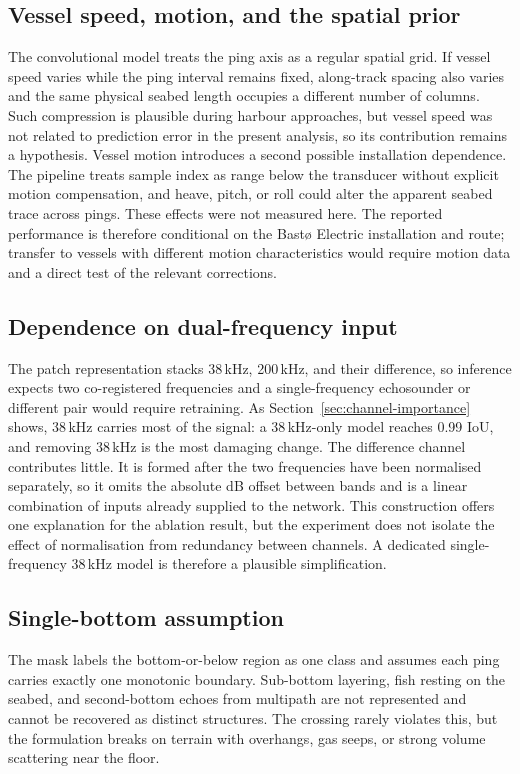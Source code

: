 \subsection{Vessel speed, motion, and the spatial prior}
\label{sec:vessel-speed-prior}
The convolutional model treats the ping axis as a regular spatial grid. If vessel speed varies while the ping interval remains fixed, along-track spacing also varies and the same physical seabed length occupies a different number of columns. Such compression is plausible during harbour approaches, but vessel speed was not related to prediction error in the present analysis, so its contribution remains a hypothesis. Vessel motion introduces a second possible installation dependence. The pipeline treats sample index as range below the transducer without explicit motion compensation, and heave, pitch, or roll could alter the apparent seabed trace across pings. These effects were not measured here. The reported performance is therefore conditional on the Bast\o{} Electric installation and route; transfer to vessels with different motion characteristics would require motion data and a direct test of the relevant corrections.

\subsection{Dependence on dual-frequency input}
The patch representation stacks 38\,kHz, 200\,kHz, and their difference, so inference expects two co-registered frequencies and a single-frequency echosounder or different pair would require retraining. As Section~\ref{sec:channel-importance} shows, 38\,kHz carries most of the signal: a 38\,kHz-only model reaches 0.99 IoU, and removing 38\,kHz is the most damaging change. The difference channel contributes little. It is formed after the two frequencies have been normalised separately, so it omits the absolute dB offset between bands and is a linear combination of inputs already supplied to the network. This construction offers one explanation for the ablation result, but the experiment does not isolate the effect of normalisation from redundancy between channels. A dedicated single-frequency 38\,kHz model is therefore a plausible simplification.

\subsection{Single-bottom assumption}
The mask labels the bottom-or-below region as one class and assumes each ping carries exactly one monotonic boundary. Sub-bottom layering, fish resting on the seabed, and second-bottom echoes from multipath are not represented and cannot be recovered as distinct structures. The crossing rarely violates this, but the formulation breaks on terrain with overhangs, gas seeps, or strong volume scattering near the floor.


